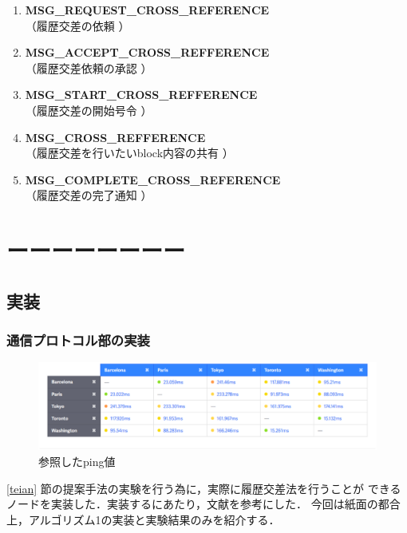 \documentclass[a4paper,12pt]{jsarticle}
\begin{document}
\hspace{5mm}
%
\begin{enumerate}
\item \textbf{MSG\_REQUEST\_CROSS\_REFERENCE}\\
\hspace{12mm} （履歴交差の依頼 ）
\item \textbf{MSG\_ACCEPT\_CROSS\_REFFERENCE}\\
\hspace{12mm}  （履歴交差依頼の承認 ）
  \item \textbf{MSG\_START\_CROSS\_REFFERENCE}\\
\hspace{12mm}  （履歴交差の開始号令 ）
  \item \textbf{MSG\_CROSS\_REFFERENCE}\\
\hspace{12mm}  （履歴交差を行いたいblock内容の共有 ）
  \item \textbf{MSG\_COMPLETE\_CROSS\_REFERENCE}\\
\hspace{12mm}  （履歴交差の完了通知 ）
\end{enumerate}
%
\hspace{5mm}

\section{ーーーーーーーー}
\subsection{実装}
\subsubsection{通信プロトコル部の実装}
\label{syuhou}

%
\begin{figure}[tbh]
  \begin{center}
    \includegraphics{pht/Screenshot.eps}
  \end{center}
	\caption{参照したping値\cite{pings}}
  \label{fig:pings}
\end{figure}
%
\ref{teian} 節の提案手法の実験を行う為に，実際に履歴交差法を行うことが
できるノードを実装した．実装するにあたり，文献\cite{hamatsu2018}を参考にした．
今回は紙面の都合上，アルゴリズム1の実装と実験結果のみを紹介する．
\end{document}
